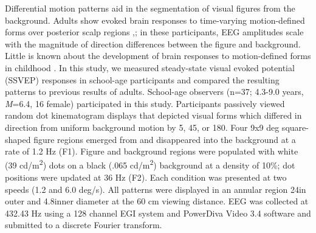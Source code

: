 \documentclass[landscape,final,paperwidth=72in,paperheight=42in,fontscale=0.285]{baposter}
\begin{document}
\begin{poster}
%
    {
      Differential motion patterns aid in the segmentation of visual figures from the background. 
Adults show evoked brain responses to time-varying motion-defined forms over posterior scalp regions \cite{fesi_cortical_2014},\cite{fesi_distinct_2011}; in these participants, EEG amplitudes scale with the magnitude of direction differences between the figure and background.
      Little is known about the development of brain responses to motion-defined forms in childhood \cite{gilmore_childrens_2016}. In this study, we measured steady-state visual evoked potential (SSVEP) responses in school-age participants and compared the resulting patterns to previous results of adults.    
    }
    {
      School-age observers (n=37; 4.3-9.0 years, \emph{M}=6.4, 16 female) participated in this study.  
      Participants passively viewed random dot kinematogram displays that depicted visual forms which differed in direction from uniform background motion by 5\degree, 45\degree, or 180\degree. Four 9x9 deg square-shaped figure regions emerged from and disappeared into the background at a rate of 1.2 Hz (F1). Figure and background regions were populated with white (39 cd/m\textsuperscript{2}) dots on a black (.065 cd/m\textsuperscript{2}) background at a density of 10\%; dot positions were updated at 36 Hz (F2). Each condition was presented at two speeds (1.2 and 6.0 deg/s). All patterns were displayed in an annular region 24\degree in outer and 4.8\degree inner diameter at the 60 cm viewing distance.  
      EEG was collected at 432.43 Hz using a 128 channel EGI system and PowerDiva Video 3.4 software and submitted to a discrete Fourier transform. 
}
\end{poster}
\end{document}
